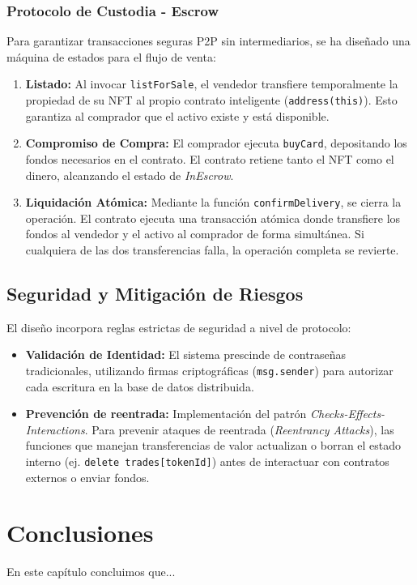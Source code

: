 \subsubsection{Protocolo de Custodia - Escrow}
Para garantizar transacciones seguras P2P sin intermediarios, se ha diseñado una máquina de estados para el 
flujo de venta:

\begin{enumerate}
    \item \textbf{Listado:} Al invocar \texttt{listForSale}, el vendedor transfiere temporalmente la propiedad de 
        su NFT al propio contrato inteligente (\texttt{address(this)}). Esto garantiza al comprador que el activo 
        existe y está disponible. 
    \item \textbf{Compromiso de Compra:} El comprador ejecuta \texttt{buyCard}, depositando los fondos necesarios en el contrato. 
        El contrato retiene tanto el NFT como el dinero, alcanzando el estado de \textit{InEscrow}.
    \item \textbf{Liquidación Atómica:} Mediante la función \texttt{confirmDelivery}, se cierra la operación. El 
        contrato ejecuta una transacción atómica donde transfiere los fondos al vendedor y el activo al comprador 
        de forma simultánea. Si cualquiera de las dos transferencias falla, la operación completa se revierte.
\end{enumerate}

\subsection{Seguridad y Mitigación de Riesgos}
El diseño incorpora reglas estrictas de seguridad a nivel de protocolo:
\begin{itemize}
    \item \textbf{Validación de Identidad:} El sistema prescinde de contraseñas tradicionales, utilizando firmas 
    criptográficas (\texttt{msg.sender}) para autorizar cada escritura en la base de datos distribuida.
    \item \textbf{Prevención de reentrada:} Implementación del patrón \textit{Checks-Effects-Interactions}. Para 
    prevenir ataques de reentrada (\textit{Reentrancy Attacks}), las funciones que manejan transferencias de valor 
    actualizan o borran el estado interno (ej. \texttt{delete trades[tokenId]}) antes de interactuar con contratos 
    externos o enviar fondos.
\end{itemize}


\section{Conclusiones}
En este capítulo concluimos que...